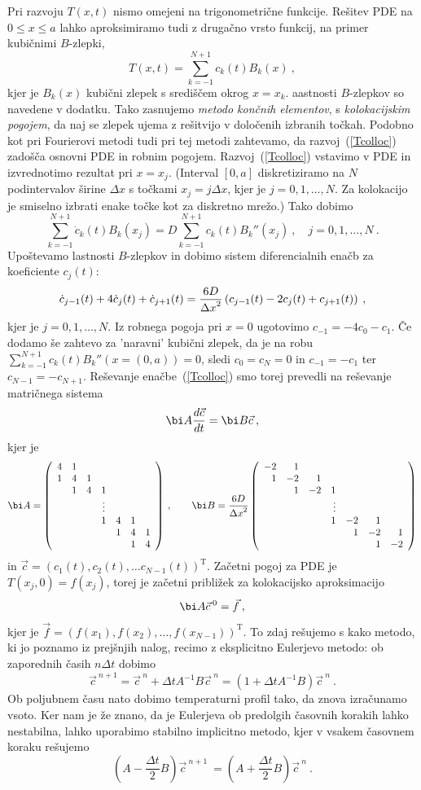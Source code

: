 \documentclass{article}
\begin{document}
Pri razvoju $T(x,t)$ nismo omejeni
na trigonometrične funkcije.  Rešitev PDE na $0\le x\le a$
lahko aproksimiramo tudi z drugačno vrsto funkcij,
na primer kubičnimi $B$-zlepki,
\begin{equation}
T(x,t) = \sum_{k=-1}^{N+1} c_k(t) B_k(x) \>,
\label{Tcolloc}
\end{equation}
kjer je $B_k(x)$ kubični zlepek s središčem okrog $x=x_k$.
aastnosti $B$-zlepkov so navedene v dodatku.  Tako zasnujemo
{\sl metodo končnih elementov}, s \emph{kolokacijskim pogojem}, da naj se zlepek
ujema z rešitvijo v določenih izbranih točkah.  Podobno kot pri Fourierovi metodi
tudi pri tej metodi zahtevamo, da razvoj~(\ref{Tcolloc})
zadošča osnovni PDE in robnim pogojem.  Razvoj~(\ref{Tcolloc})
vstavimo v PDE in izvrednotimo rezultat pri $x=x_j$.
(Interval $[0,a]$ diskretiziramo na $N$ podintervalov širine
$\Delta x$ s točkami $x_j=j{\Delta x}$, kjer je $j=0,1,\ldots,N$.
Za kolokacijo je smiselno izbrati enake točke kot za diskretno
mrežo.)  Tako dobimo
$$
\sum_{k=-1}^{N+1} \dot{c}_k(t) B_k(x_j) =
D \sum_{k=-1}^{N+1} c_k(t) B_k''(x_j) \>, \quad j = 0,1,\ldots,N \>.
$$
Upoštevamo lastnosti $B$-zlepkov in dobimo sistem
diferencialnih enačb za koeficiente $c_j(t)$:
$$
\dot{c}_{j-1}(t) + 4\dot{c}_j(t) + \dot{c}_{j+1}(t)
= {6D\over{\Delta x}^2} \left(c_{j-1}(t) - 2c_j(t) + c_{j+1}(t) \right) \>,
$$
kjer je $j=0,1,\ldots,N$.  Iz robnega pogoja pri $x=0$
ugotovimo $c_{-1} = -4c_0 - c_1$. Če dodamo še zahtevo za 'naravni' kubični
zlepek, da je na robu $\sum_{k=-1}^{N+1} c_k(t) B_k''(x=(0,a))=0$, sledi
 $c_0=c_N=0$ in $c_{-1}=-c_1$ ter $c_{N-1}=-c_{N+1}$.
Reševanje enačbe~(\ref{Tcolloc}) smo torej prevedli
na reševanje matričnega sistema
$$
{\bi A}\frac{d\vec{c}}{dt} = {\bi B}\vec{c} \>,
$$
kjer je
$$
{\bi A} = \left(
\begin{array}{ccccccc}
4 & 1 \cr
1 & 4 & 1 \cr
  & 1 & 4 & 1 \cr
  &   &   & \vdots \cr
  &   &   & 1 & 4 & 1 & \cr
  &   &   &   & 1 & 4 & 1 \cr
  &   &   &   &   & 1 & 4
\end{array}
\right) \>, \qquad
{\bi B} = {6D\over{\Delta x}^2} \left(
\begin{array}{rrrrrrr}
-2 & 1 \cr
1 & -2 & 1 \cr
  & 1 & -2 & 1 \cr
  &   &   & \vdots \cr
  &   &   & 1 & -2 & 1 & \cr
  &   &   &   & 1 & -2 & 1 \cr
  &   &   &   &   & 1 & -2
\end{array}
\right)
$$
in $\vec{c} = (c_1(t), c_2(t), \ldots c_{N-1}(t))^\mathrm{T}$.
Začetni pogoj za PDE je $T(x_j,0) = f(x_j)$, torej je začetni
približek za kolokacijsko aproksimacijo
$$
{\bi A}\vec{c}^{\>0} = \vec{f} \>,
$$
kjer je $\vec{f}=(f(x_1),f(x_2),\ldots,f(x_{N-1}))^\mathrm{T}$.
To zdaj rešujemo s kako metodo, ki jo poznamo iz prejšnjih
nalog, recimo z eksplicitno Eulerjevo metodo: ob zaporednih
časih $n{\Delta t}$ dobimo
$$
\vec{c}^{\>n+1} = \vec{c}^{\>n} + {\Delta t}{ A}^{-1}{ B}\vec{c}^{\>n}
 = ( { 1} + {\Delta t}{ A}^{-1}{ B})\vec{c}^{\>n} \>.
$$
Ob poljubnem času nato dobimo temperaturni profil tako,
da znova izračunamo vsoto.
Ker nam je že znano, da je Eulerjeva ob predolgih časovnih korakih
lahko nestabilna, lahko uporabimo stabilno implicitno metodo,
kjer v vsakem časovnem koraku rešujemo
$$
  \left( { A} - \frac{\Delta t}{2}{ B}\right)\vec{c}^{\>n+1} \>
 = \left( { A} + \frac{\Delta t}{2}{ B}\right)\vec{c}^{\>n} \>.
$$
\newpage
\end{document}

